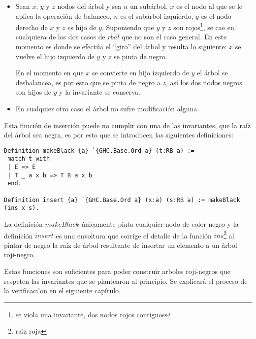 \documentclass[letterpaper,12pt,oneside]{book}
\newcommand{\arn}{árbol roji-negro}
\newcommand{\arns}{arboles roji-negros}
\theoremstyle{plain}
\theoremstyle{definition}
\theoremstyle{remark}
\begin{document}
\begin{itemize}
    \item Sean $x$, $y$ y $z$ nodos del \'arbol y sea $n$ un subárbol, $x$ es el nodo al que se le aplica
    la operaci\'on de balanceo, $n$ es el subárbol izquierdo, $y$ es el nodo derecho  de $x$ y $z$ es hijo de
    $y$. Suponiendo que $y$ y $z$ son rojos\footnote{se viola una invariante, dos nodos rojos contiguos},
    se cae en cualquiera de los dos casos de $rbal$ que no son el caso general. En este momento es donde
    se efectúa el ``giro'' del árbol y resulta lo siguiente: $x$ se vuelve el hijo izquierdo de $y$ y $z$ se pinta de negro.
    
    En el momento en que $x$ se convierte en hijo izquierdo de $y$ el \'arbol se desbalancea, es por esto que se pinta de negro a $z$, así los dos nodos negros son hijos de $y$ y la invariante se conserva.
    \item En cualquier otro caso el \'arbol no sufre modificaci\'on alguna.
\end{itemize}{}

Esta función de inserción puede no cumplir con una de las invariantes, que la raíz del árbol sea negra, es por esto que se introducen las siguientes definiciones:

\begin{verbatim}
Definition makeBlack {a} `{GHC.Base.Ord a} (t:RB a) :=
 match t with
 | E => E
 | T _ a x b => T B a x b
 end.

Definition insert {a} `{GHC.Base.Ord a} (x:a) (s:RB a) := makeBlack (ins x s).
\end{verbatim}

La definici\'on $makeBlack$ únicamente pinta cualquier nodo de color negro y la definición $insert$ es una envoltura que corrige el detalle de la función $ins$\footnote{raiz roja} al pintar de negro la raíz de árbol resultante de insertar un elemento a un {\arn}.

Estas funciones son suficientes para poder construir {\arns} que respeten las invariantes que se plantearon al principio. Se explicar\'a el proceso de la verificaci'on en el siguiente cap\'itulo.
\end{document}
